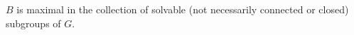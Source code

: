 $B$ is maximal in the collection of solvable (not necessarily connected or closed) subgroups of $G$.
